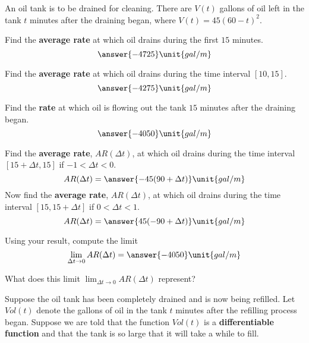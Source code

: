 \documentclass{ximera}
\begin{document}
An oil tank is to be drained for cleaning. There are $V(t)$ gallons of oil left in the tank $t$ minutes after the draining began, where $V(t)=45(60-t)^2$.
\begin{exercise}
Find the \textbf{average rate} at which oil drains during the first $15$ minutes. 
\[
\answer{-4725}\unit{gal/m}
\]
\begin{exercise}
Find the \textbf{average rate} at which oil drains during the time interval $[10,15]$. 
\[
\answer{-4275}\unit{gal/m}
\]
\begin{exercise}
Find the \textbf{rate} at which oil is flowing out the tank $15$ minutes after the draining began.
\[
\answer{-4050}\unit{gal/m}
\]
\begin{exercise}
Find the \textbf{average rate}, $AR(\Delta t)$, at which oil drains during the time interval $[15+\Delta t,15]$ if $-1<\Delta t<0$. 
\[
AR(\Delta t)=\answer{-45(90+\Delta t)}\unit{gal/m}
\]
Now find the \textbf{average rate}, $AR(\Delta t)$, at which oil drains during the time interval $[15,15+\Delta t]$ if $0<\Delta t<1$. 
\[
AR(\Delta t)=\answer{45(-90+\Delta t)}\unit{gal/m}
\]
\begin{exercise}
Using your result, compute the limit
\[
\lim_{\Delta t\to 0}AR(\Delta t)=\answer{-4050}\unit{gal/m}
\]
\begin{exercise}
What does this limit $\lim_{\Delta t\to 0}AR(\Delta t)$ represent?
\begin{multipleChoice}
\end{multipleChoice}
\begin{exercise}
Suppose the oil tank has been completely drained and is now being refilled. Let $Vol(t)$ denote the gallons of oil in the tank $t$ minutes after the refilling process began. Suppose we are told that the function $Vol(t)$ is a \textbf{differentiable function} and that the tank is so large that it will take a while to fill. 


\end{exercise}
\end{exercise}
\end{exercise}
\end{exercise}
\end{exercise}
\end{exercise}
\end{exercise}
\end{document}
